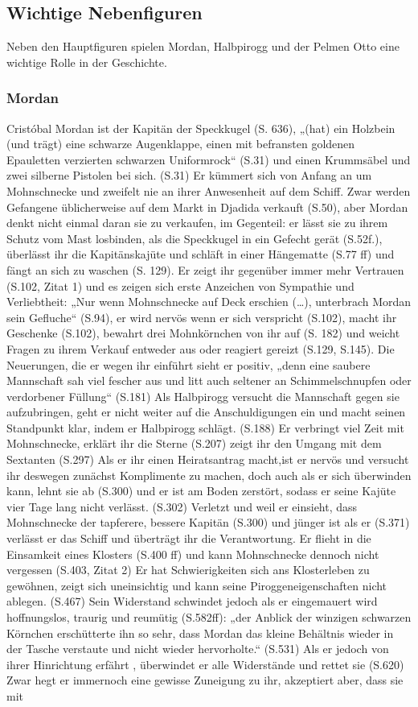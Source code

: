 {\subsection{Wichtige Nebenfiguren}
Neben den Hauptfiguren spielen Mordan, Halbpirogg und der Pelmen Otto eine wichtige Rolle in der Geschichte.

\subsubsection{Mordan}
Cristóbal Mordan ist der Kapitän der Speckkugel (S. 636), „(hat) ein Holzbein (und trägt) eine schwarze Augenklappe, einen mit befransten goldenen Epauletten verzierten schwarzen Uniformrock“ (S.31) und einen  Krummsäbel und zwei silberne Pistolen bei sich. (S.31) Er kümmert sich von Anfang an um Mohnschnecke und zweifelt nie an ihrer Anwesenheit auf dem Schiff. Zwar werden Gefangene üblicherweise auf dem Markt in Djadida verkauft (S.50), aber Mordan denkt nicht einmal daran sie zu verkaufen, im Gegenteil:  er lässt sie zu ihrem Schutz vom Mast losbinden, als die Speckkugel in ein Gefecht gerät (S.52f.), überlässt ihr die Kapitänskajüte und schläft in einer Hängematte (S.77 ff) und fängt an sich zu waschen (S. 129). Er zeigt ihr gegenüber immer mehr Vertrauen (S.102, Zitat 1) und es zeigen sich erste Anzeichen von Sympathie und Verliebtheit: „Nur wenn Mohnschnecke auf Deck erschien (…), unterbrach Mordan sein Gefluche“ (S.94), er wird nervös wenn er sich verspricht (S.102), macht ihr Geschenke (S.102), bewahrt drei Mohnkörnchen von ihr auf (S. 182) und weicht Fragen zu ihrem Verkauf entweder aus oder reagiert gereizt (S.129, S.145). Die Neuerungen, die er wegen ihr einführt sieht er positiv, „denn eine saubere Mannschaft sah viel fescher aus und litt auch seltener an Schimmelschnupfen oder verdorbener Füllung“ (S.181) Als Halbpirogg versucht die Mannschaft gegen sie aufzubringen, geht er nicht weiter auf die Anschuldigungen ein und macht seinen Standpunkt klar, indem er Halbpirogg schlägt. (S.188) Er verbringt viel Zeit mit Mohnschnecke, erklärt ihr die Sterne (S.207) zeigt ihr den Umgang mit dem Sextanten (S.297) Als er ihr einen Heiratsantrag macht,ist er nervös und versucht ihr deswegen zunächst Komplimente zu machen, doch auch als er sich überwinden kann,  lehnt sie ab (S.300) und er ist am Boden zerstört, sodass er seine Kajüte vier Tage lang nicht verlässt. (S.302) Verletzt und weil er einsieht, dass Mohnschnecke der tapferere, bessere Kapitän (S.300) und jünger ist als er (S.371) verlässt er das Schiff und überträgt ihr die Verantwortung. Er flieht in die Einsamkeit eines Klosters (S.400 ff) und kann Mohnschnecke dennoch nicht vergessen (S.403, Zitat 2) Er hat Schwierigkeiten sich ans Klosterleben zu gewöhnen, zeigt sich uneinsichtig und kann seine Piroggeneigenschaften nicht ablegen. (S.467) Sein Widerstand schwindet jedoch als er eingemauert wird hoffnungslos, traurig und reumütig (S.582ff): „der Anblick der winzigen schwarzen Körnchen erschütterte ihn so sehr, dass Mordan das kleine Behältnis wieder in der Tasche verstaute und nicht wieder hervorholte.“ (S.531) Als er jedoch von ihrer Hinrichtung erfährt , überwindet er alle Widerstände und rettet sie (S.620) Zwar hegt er immernoch eine gewisse Zuneigung zu ihr, akzeptiert aber, dass sie mit }

